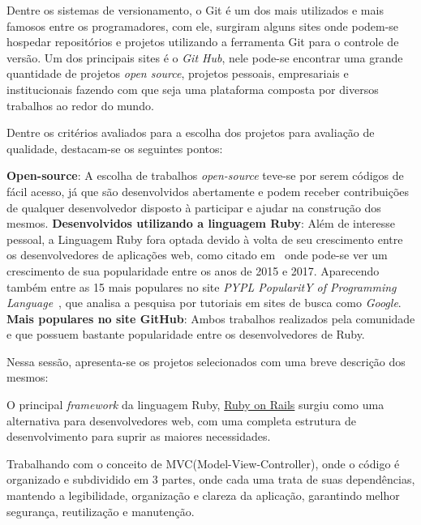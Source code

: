 \documentclass[11pt,a4paper,usenames,dvipsnames]{article}
\begin{document}
Dentre os sistemas de versionamento, o Git é um dos mais utilizados e mais famosos entre os programadores, com ele, surgiram alguns sites onde podem-se hospedar repositórios e projetos utilizando a ferramenta Git para o controle de versão. Um dos principais sites é o \textit{Git Hub}\cite{Git}, nele pode-se encontrar uma grande quantidade de projetos \textit{open source}, projetos pessoais, empresariais e institucionais fazendo com que seja uma plataforma composta por diversos trabalhos ao redor do mundo.

Dentre os critérios avaliados para a escolha dos projetos para avaliação de qualidade, destacam-se os seguintes pontos: 
\begin{center}
\begin{tasks}
		\task \textbf{Open-source}: A escolha de trabalhos \textit{open-source} teve-se por serem códigos de fácil acesso, já que são desenvolvidos abertamente e podem receber contribuições de qualquer desenvolvedor disposto à participar e ajudar na construção dos mesmos.
		\task \textbf{Desenvolvidos utilizando a linguagem Ruby}: Além de interesse pessoal, a Linguagem Ruby fora optada devido à volta de seu crescimento entre os desenvolvedores de aplicações web, como citado em~\cite{RubyTiobe} onde pode-se ver um crescimento de sua popularidade entre os anos de 2015 e 2017. Aparecendo também entre as 15 mais populares no site \textit{PYPL PopularitY of Programming Language}~\cite{PYPL}, que analisa a pesquisa por tutoriais em sites de busca como \textit{Google}. 
		\task \textbf{Mais populares no site GitHub}: Ambos trabalhos realizados pela comunidade e que possuem bastante popularidade entre os desenvolvedores de Ruby.
	\end{tasks}
\end{center}

 Nessa sessão, apresenta-se os projetos selecionados com uma breve descrição dos mesmos\cite{Projects}:

O principal \textit{framework} da linguagem Ruby, \href{https://github.com/rails/rails}{Ruby on Rails} surgiu como uma alternativa para desenvolvedores web, com uma completa estrutura de desenvolvimento para suprir as maiores necessidades. 

Trabalhando com o conceito de MVC(Model-View-Controller), onde o código é organizado e subdividido em 3 partes, onde cada uma trata de suas dependências, mantendo a legibilidade, organização e clareza da aplicação, garantindo melhor segurança, reutilização e manutenção\cite{da2012revisao, bachle2007ruby}.
\end{document}
